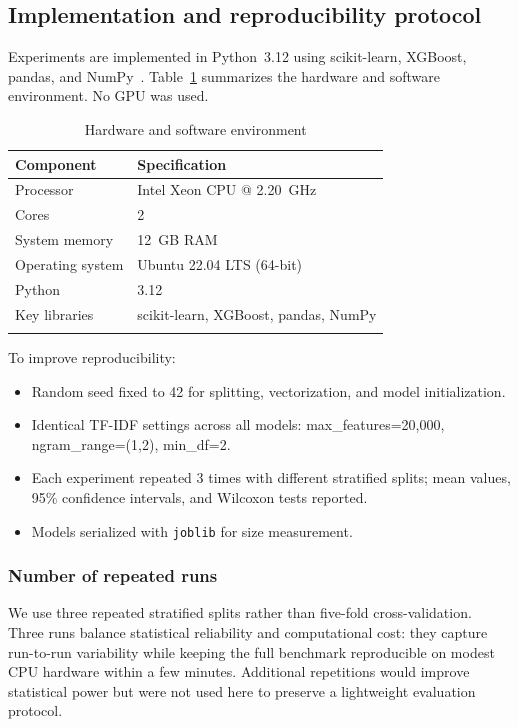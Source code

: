 \documentclass[pdflatex,sn-mathphys-num]{sn-jnl}
\begin{document}
\subsection{Implementation and reproducibility protocol}

Experiments are implemented in Python~3.12 using scikit-learn, XGBoost, pandas, and NumPy~\cite{pedregosa2011scikit,chen2016xgboost}. Table~\ref{tab:hardware} summarizes the hardware and software environment. No GPU was used.

\begin{table}[t]
\caption{Hardware and software environment}\label{tab:hardware}
\begin{tabular}{@{}ll@{}}
\toprule
Component & Specification \\
\midrule
Processor & Intel Xeon CPU @ 2.20~GHz \\
Cores & 2 \\
System memory & 12~GB RAM \\
Operating system & Ubuntu 22.04 LTS (64-bit) \\
Python & 3.12 \\
Key libraries & scikit-learn, XGBoost, pandas, NumPy \\
\botrule
\end{tabular}
\end{table}

To improve reproducibility:
\begin{itemize}
    \item Random seed fixed to 42 for splitting, vectorization, and model initialization.
    \item Identical TF-IDF settings across all models: max\_features=20{,}000, ngram\_range=(1,2), min\_df=2.
    \item Each experiment repeated 3 times with different stratified splits; mean values, 95\% confidence intervals, and Wilcoxon tests reported.
    \item Models serialized with \texttt{joblib} for size measurement.
\end{itemize}

\subsubsection{Number of repeated runs}

We use three repeated stratified splits rather than five-fold cross-validation. Three runs balance statistical reliability and computational cost: they capture run-to-run variability while keeping the full benchmark reproducible on modest CPU hardware within a few minutes. Additional repetitions would improve statistical power but were not used here to preserve a lightweight evaluation protocol.
\end{document}
